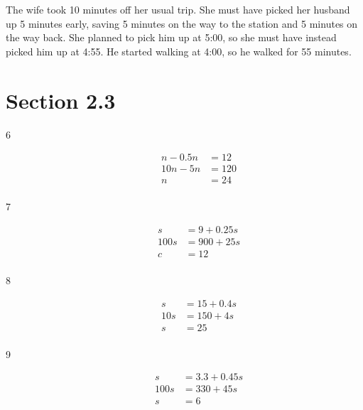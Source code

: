 \documentclass[letterpaper]{exam}
\begin{document}
  \begin{solution}
    The wife took 10 minutes off her usual trip.  She must have picked her husband up 5 minutes early, saving 5
    minutes on the way to the station and 5 minutes on the way back.  She planned to pick him up at 5:00, so she must
    have instead picked him up at 4:55.  He started walking at 4:00, so he walked for 55 minutes.
  \end{solution}

  \ifprintanswers{}
      
    \section{Section 2.3}

    \begin{description}

      \item[6]
        \begin{align*}
          n - 0.5n & = 12 \\
          10n - 5n & = 120 \\
          n        & = \boxed{ 24 } \\
        \end{align*}

      \item[7]
        \begin{align*}
          s     & = 9 + 0.25 s \\
          100 s & = 900 + 25 s \\
          c     & = \boxed{ 12 } \\
        \end{align*}

      \item[8]
        \begin{align*}
          s   & = 15 + 0.4s \\
          10s & = 150 + 4s \\
          s   & = \boxed{ 25 } \\
        \end{align*}

      \item[9]
        \begin{align*}
          s    & = 3.3 + 0.45s \\
          100s & = 330 + 45 s \\
          s    & = \boxed{ 6 } \\
        \end{align*}


\end{description}
\end{document}
